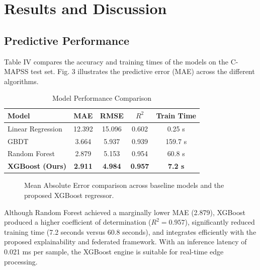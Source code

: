 \documentclass[letterpaper, 10 pt, conference]{ieeeconf}
\begin{document}
\section{Results and Discussion}
\label{sec:results}

\subsection{Predictive Performance}
\label{subsec:pred_perf}
Table IV compares the accuracy and training times of the models on the C-MAPSS test set. Fig. 3 illustrates the predictive error (MAE) across the different algorithms.

\begin{table}[htbp]
\caption{Model Performance Comparison}
\label{tab:perf}
\centering\small
\begin{tabular}{lcccc}
\toprule
\textbf{Model} & \textbf{MAE} & \textbf{RMSE} & \textbf{$R^2$} & \textbf{Train Time} \\
\midrule
Linear Regression & 12.392 & 15.096 & 0.602 & 0.25 s \\
GBDT & 3.664 & 5.937 & 0.939 & 159.7 s \\
Random Forest & 2.879 & 5.153 & 0.954 & 60.8 s \\
\textbf{XGBoost (Ours)} & \textbf{2.911} & \textbf{4.984} & \textbf{0.957} & \textbf{7.2 s} \\
\bottomrule
\end{tabular}
\end{table}

\begin{figure}[htbp]
\centering
{}
\caption{Mean Absolute Error comparison across baseline models and the proposed XGBoost regressor.}
\label{fig:model_bar}
\end{figure}

Although Random Forest achieved a marginally lower MAE (2.879), XGBoost produced a higher coefficient of determination ($R^2=0.957$), significantly reduced training time (7.2 seconds versus 60.8 seconds), and integrates efficiently with the proposed explainability and federated framework. With an inference latency of 0.021 ms per sample, the XGBoost engine is suitable for real-time edge processing.
\end{document}
